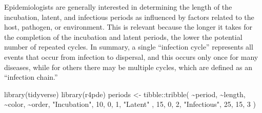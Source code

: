 \documentclass[
  letterpaper,
]{book}
\newenvironment{Shaded}{\begin{snugshade}}{\end{snugshade}}
\newcommand{\DecValTok}[1]{\textcolor[rgb]{0.68,0.00,0.00}{#1}}
\newcommand{\FunctionTok}[1]{\textcolor[rgb]{0.28,0.35,0.67}{#1}}
\newcommand{\NormalTok}[1]{\textcolor[rgb]{0.00,0.23,0.31}{#1}}
\newcommand{\OtherTok}[1]{\textcolor[rgb]{0.00,0.23,0.31}{#1}}
\newcommand{\SpecialCharTok}[1]{\textcolor[rgb]{0.37,0.37,0.37}{#1}}
\newcommand{\StringTok}[1]{\textcolor[rgb]{0.13,0.47,0.30}{#1}}
\begin{document}
Epidemiologists are generally interested in determining the length of
the incubation, latent, and infectious periods as influenced by factors
related to the host, pathogen, or environment. This is relevant because
the longer it takes for the completion of the incubation and latent
periods, the lower the potential number of repeated cycles. In summary,
a single ``infection cycle'' represents all events that occur from
infection to dispersal, and this occurs only once for many diseases,
while for others there may be multiple cycles, which are defined as an
``infection chain.''

\begin{Shaded}
\begin{Highlighting}[]
\FunctionTok{library}\NormalTok{(tidyverse)}
\FunctionTok{library}\NormalTok{(r4pde)}
\NormalTok{periods }\OtherTok{\textless{}{-}}\NormalTok{ tibble}\SpecialCharTok{::}\FunctionTok{tribble}\NormalTok{(}
  \SpecialCharTok{\textasciitilde{}}\NormalTok{period, }\SpecialCharTok{\textasciitilde{}}\NormalTok{length, }\SpecialCharTok{\textasciitilde{}}\NormalTok{color, }\SpecialCharTok{\textasciitilde{}}\NormalTok{order,}
  \StringTok{"Incubation"}\NormalTok{, }\DecValTok{10}\NormalTok{, }\DecValTok{0}\NormalTok{, }\DecValTok{1}\NormalTok{,}
  \StringTok{"Latent"}\NormalTok{ , }\DecValTok{15}\NormalTok{, }\DecValTok{0}\NormalTok{, }\DecValTok{2}\NormalTok{,}
  \StringTok{"Infectious"}\NormalTok{, }\DecValTok{25}\NormalTok{, }\DecValTok{15}\NormalTok{, }\DecValTok{3}
\NormalTok{)}


\end{Highlighting}
\end{Shaded}
\end{document}
